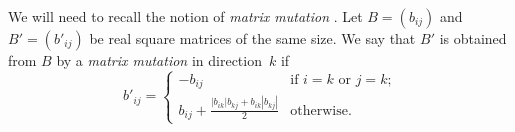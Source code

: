 \documentclass[letterpaper]{amsart}
\numberwithin{equation}{section}
\theoremstyle{definition}
\newtheorem{definition}[theorem]{Definition}
\begin{document}
We will need to recall the notion of \emph{matrix mutation} 
\cite[Definition~4.2]{fz-clust1}. 
Let %
$B = (b_{ij})%
$ 
and $B' = (b'_{ij})%
$ 
be %
real square matrices of the same size. 
We say that $B'$ is obtained from $B$ by a \emph{matrix mutation} in direction~$k$ 
if 
\begin{equation} 
\label{eq:mutation} 
b'_{ij} = 
\begin{cases} 
-b_{ij} & \text{if $i=k$ or $j=k$;} \\[.05in] 
b_{ij} + \displaystyle\frac{|b_{ik}| b_{kj} + 
b_{ik} |b_{kj}|}{2} & \text{otherwise.} 
\end{cases} 
\end{equation} 
 
\end{document}
